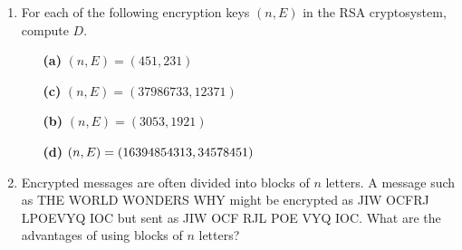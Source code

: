 {\begin{enumerate}
\begin{minipage}[t]{4.6in}
\begin{minipage}[t]{2.25in}
\begin{itemize}
 \item[{\bf (b)}]
$n = 5893, D = 81, y = 34$
 
 \item[{\bf (d)}]
$n = 79403, D = 671,\\ y = 129381$
 
\end{itemize}
\end{minipage}
\end{minipage}
 
\vspace{2pt}        %
 
 
 
\bf\item\rm
For each of the following encryption keys $(n, E)$ in the RSA
cryptosystem, compute $D$.
 
\vspace{3pt}        %
 
\hspace{-7pt}
\begin{minipage}[t]{4.6in}
\noindent
\begin{minipage}[t]{2.25in}
\begin{itemize}
 
 \item[{\bf (a)}]
$(n, E) = (451, 231)$
 
 \item[{\bf (c)}]
$(n, E) = (37986733, 12371)$
 
\end{itemize}
\end{minipage} \hfill
\begin{minipage}[t]{2.25in}
\begin{itemize}
 
 \item[{\bf (b)}]
$(n, E) = (3053, 1921)$
 
 \item[{\bf (d)}]
$(n, E) =\\ (16394854313, 34578451)$
 
\end{itemize}
\end{minipage}
\end{minipage}
 
\vspace{2pt}        %
 
 
 
 
\bf\item\rm
Encrypted messages are often divided into blocks of $n$ letters. A
message such as THE WORLD WONDERS WHY might be encrypted as 
JIW OCFRJ LPOEVYQ IOC but sent as JIW OCF RJL POE VYQ
IOC.  What are the advantages of using blocks of $n$ letters? 
 

\end{enumerate}}
